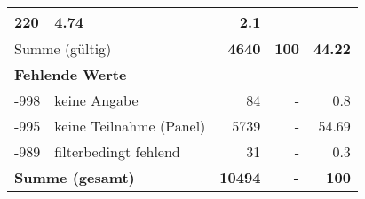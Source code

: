 \begin{longtable}{lXrrr}
       \num{220} &
       \num[round-mode=places,round-precision=2]{4,74} &
         \num[round-mode=places,round-precision=2]{2,1} \\
     \midrule
     \multicolumn{2}{l}{Summe (gültig)} &
       \textbf{\num{4640}} &
     \textbf{100} &
       \textbf{\num[round-mode=places,round-precision=2]{44,22}} \\
     \multicolumn{5}{l}{\textbf{Fehlende Werte}}\\
       -998 &
       keine Angabe &
         \num{84} &
        - &
         \num[round-mode=places,round-precision=2]{0,8} \\
       -995 &
       keine Teilnahme (Panel) &
         \num{5739} &
        - &
         \num[round-mode=places,round-precision=2]{54,69} \\
       -989 &
       filterbedingt fehlend &
         \num{31} &
        - &
         \num[round-mode=places,round-precision=2]{0,3} \\
     \midrule
     \multicolumn{2}{l}{\textbf{Summe (gesamt)}} &
          \textbf{\num{10494}} &
        \textbf{-} &
        \textbf{100} \\
     \bottomrule
     \end{longtable}
     
